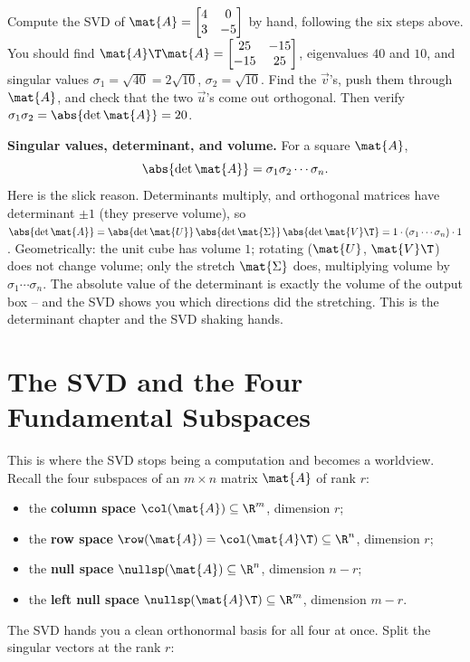 \begin{labbox}
Compute the SVD of $\mat{A} = \begin{bmatrix} 4 & 0 \\ 3 & -5\end{bmatrix}$ by
hand, following the six steps above. You should find $\mat{A}\T\mat{A} =
\begin{bmatrix} 25 & -15 \\ -15 & 25\end{bmatrix}$, eigenvalues $40$ and $10$, and
singular values $\sigma_1 = \sqrt{40} = 2\sqrt{10}$, $\sigma_2 = \sqrt{10}$. Find
the $\vec{v}$'s, push them through $\mat{A}$, and check that the two $\vec{u}$'s
come out orthogonal. Then verify $\sigma_1\sigma_2 = \abs{\det\mat{A}} = 20$.
\end{labbox}

\begin{connectionbox}
\textbf{Singular values, determinant, and volume.} For a square $\mat{A}$,
\[
  \abs{\det\mat{A}} = \sigma_1\sigma_2\cdots\sigma_n.
\]
Here is the slick reason. Determinants multiply, and orthogonal matrices have
determinant $\pm 1$ (they preserve volume), so
$\abs{\det\mat{A}} = \abs{\det\mat{U}}\,\abs{\det\mat{\Sigma}}\,\abs{\det\mat{V}\T}
= 1\cdot(\sigma_1\cdots\sigma_n)\cdot 1$. Geometrically: the unit cube has
volume $1$; rotating ($\mat{U}$, $\mat{V}\T$) does not change volume; only the
stretch $\mat{\Sigma}$ does, multiplying volume by $\sigma_1\cdots\sigma_n$. The
absolute value of the determinant is exactly the volume of the output box -- and
the SVD shows you which directions did the stretching. This is the determinant
chapter and the SVD shaking hands.
\end{connectionbox}

\section{The SVD and the Four Fundamental Subspaces}
\label{ch29:four-subspaces}

This is where the SVD stops being a computation and becomes a worldview. Recall
the four subspaces of an $m\times n$ matrix $\mat{A}$ of rank $r$:
\begin{itemize}
  \item the \textbf{column space} $\col(\mat{A}) \subseteq \R^m$, dimension $r$;
  \item the \textbf{row space} $\row(\mat{A}) = \col(\mat{A}\T) \subseteq \R^n$, dimension $r$;
  \item the \textbf{null space} $\nullsp(\mat{A}) \subseteq \R^n$, dimension $n-r$;
  \item the \textbf{left null space} $\nullsp(\mat{A}\T) \subseteq \R^m$, dimension $m-r$.
\end{itemize}
The SVD hands you a clean orthonormal basis for all four at once. Split the
singular vectors at the rank $r$:

